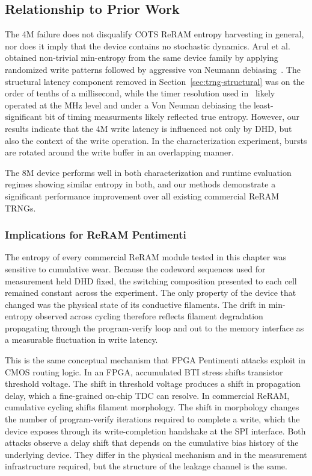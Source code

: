 \subsection{Relationship to Prior Work}
The 4M failure does not disqualify COTS ReRAM entropy harvesting in
general, nor does it imply that the device contains no stochastic
dynamics. Arul et al.~\cite{tolga2024trng} obtained non-trivial
min-entropy from the same device family by applying randomized write
patterns followed by aggressive von Neumann
debiasing~\cite{von1963various}. The structural latency component
removed in Section~\ref{sec:trng-structural} was on the order of tenths
of a millisecond, while the timer resolution used
in~\cite{tolga2024trng} likely operated at the MHz level and under a Von
Neuman debiasing the least-significant bit of timing measurments likely
reflected true entropy. However, our results indicate that the 4M write
latency is influenced not only by DHD, but also the context of the write
operation. In the characterization experiment, bursts are rotated around
the write buffer in an overlapping manner.

The 8M device performs well in both characterization and runtime
evaluation regimes showing similar entropy in both, and our methods
demonstrate a significant performance improvement over all existing
commercial ReRAM TRNGs.

\subsubsection{Implications for ReRAM Pentimenti}

The entropy of every commercial ReRAM module tested in this chapter was
sensitive to cumulative wear. Because the codeword sequences used for
measurement held DHD fixed, the switching composition presented to each
cell remained constant across the experiment. The only property of the
device that changed was the physical state of its conductive filaments.
The drift in min-entropy observed across cycling therefore reflects
filament degradation propagating through the program-verify loop and out
to the memory interface as a measurable fluctuation in write latency.

This is the same conceptual mechanism that FPGA Pentimenti attacks
exploit in CMOS routing logic. In an FPGA, accumulated BTI stress shifts
transistor threshold voltage. The shift in threshold voltage produces a
shift in propagation delay, which a fine-grained on-chip TDC can
resolve. In commercial ReRAM, cumulative cycling shifts filament
morphology. The shift in morphology changes the number of program-verify
iterations required to complete a write, which the device exposes
through its write-completion handshake at the SPI interface. Both
attacks observe a delay shift that depends on the cumulative bias
history of the underlying device. They differ in the physical mechanism
and in the measurement infrastructure required, but the structure of the
leakage channel is the same.


